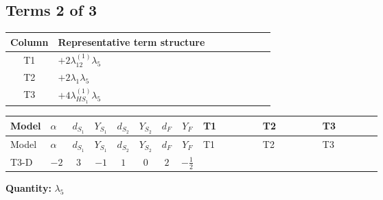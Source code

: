 \documentclass[8pt]{article}
\begin{document}
\begin{landscape}
\subsection*{Terms 2 of 3}
\begin{center}
\begin{tabular}{@{}c >{\raggedright\arraybackslash}p{0.82\linewidth}@{}}
\toprule
Column & Representative term structure \\
\midrule
T1 & \(\displaystyle +2 {\lambda_{12}^{(1)}} {\lambda_5}\) \\
\midrule
T2 & \(\displaystyle +2 {\lambda_1} {\lambda_5}\) \\
\midrule
T3 & \(\displaystyle +4 {\lambda_{HS_1}^{(1)}} {\lambda_5}\) \\
\midrule
\bottomrule
\end{tabular}
\end{center}
\smallskip
\tiny
\begin{longtable}{@{}llcccccc >{\raggedright\arraybackslash}p{0.21\linewidth} >{\raggedright\arraybackslash}p{0.21\linewidth} >{\raggedright\arraybackslash}p{0.21\linewidth}@{}}
\toprule
Model & $\alpha$ & $d_{S_1}$ & $Y_{S_1}$ & $d_{S_2}$ & $Y_{S_2}$ & $d_F$ & $Y_F$ & T1 & T2 & T3 \\
\midrule
\endfirsthead
\toprule
Model & $\alpha$ & $d_{S_1}$ & $Y_{S_1}$ & $d_{S_2}$ & $Y_{S_2}$ & $d_F$ & $Y_F$ & T1 & T2 & T3 \\
\midrule
\endhead
T3-D & $-2$ & $3$ & $-1$ & $1$ & $0$ & $2$ & $-\frac{1}{2}$ & \scriptsize\adjustbox{max width=\linewidth}{$\begin{gathered} +2 {\lambda_{12}^{(1)}} {\lambda_5}\end{gathered}$} & \scriptsize\adjustbox{max width=\linewidth}{$\begin{gathered} +2 {\lambda_1} {\lambda_5}\end{gathered}$} & \scriptsize\adjustbox{max width=\linewidth}{$\begin{gathered} +4 {\lambda_{HS_1}^{(1)}} {\lambda_5}\end{gathered}$} \\
\midrule
\bottomrule
\end{longtable}
\clearpage
\noindent\textbf{Quantity: }$\lambda_5$\par\smallskip

\end{landscape}
\end{document}

